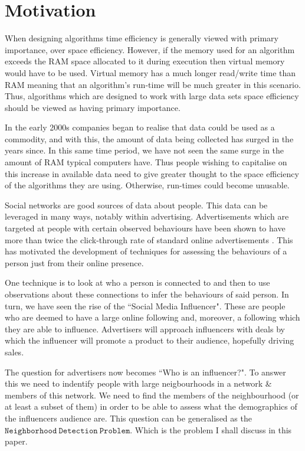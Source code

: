 \documentclass[11pt,twoside,a4paper]{report}
\begin{document}
\section{Motivation}
\par When designing algorithms time efficiency is generally viewed with primary importance, over space efficiency. However, if the memory used for an algorithm exceeds the RAM space allocated to it during execution then virtual memory would have to be used. Virtual memory has a much longer read/write time than RAM meaning that an algorithm's run-time will be much greater in this scenario. Thus, algorithms which are designed to work with large data sets space efficiency should be viewed as having primary importance.
\par In the early 2000s companies began to realise that data could be used as a commodity, and with this, the amount of data being collected has surged in the years since. In this same time period, we have not seen the same surge in the amount of RAM typical computers have. Thus people wishing to capitalise on this increase in available data need to give greater thought to the space efficiency of the algorithms they are using. Otherwise, run-times could become unusable.
\par Social networks are good sources of data about people. This data can be leveraged in many ways, notably within advertising. Advertisements which are targeted at people with certain observed behaviours have been shown to have more than twice the click-through rate of standard online advertisements \cite{targetedAds}. This has motivated the development of techniques for assessing the behaviours of a person just from their online presence.
\par One technique is to look at who a person is connected to and then to use observations about these connections to infer the behaviours of said person. In turn, we have seen the rise of the ``Social Media Influencer". These are people who are deemed to have a large online following and, moreover, a following which they are able to influence. Advertisers will approach influencers with deals by which the influencer will promote a product to their audience, hopefully driving sales.
\par The question for advertisers now becomes ``Who is an influencer?". To answer this we need to indentify people with large neigbourhoods in a network \& members of this network. We need to find the members of the neighbourhood (or at least a subset of them) in order to be able to assess what the demographics of the influencers audience are. This question can be generalised as the $\mathtt{Neighborhood\ Detection\ Problem}$. Which is the problem I shall discuss in this paper.
\end{document}
